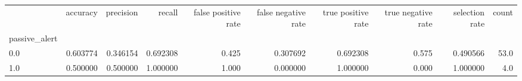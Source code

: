 \begin{tabular}{lrrrrrrrrr}
\toprule
{} &  accuracy &  precision &    recall &  false positive rate &  false negative rate &  true positive rate &  true negative rate &  selection rate &  count \\
passive\_alert &           &            &           &                      &                      &                     &                     &                 &        \\
\midrule
0.0           &  0.603774 &   0.346154 &  0.692308 &                0.425 &             0.307692 &            0.692308 &               0.575 &        0.490566 &   53.0 \\
1.0           &  0.500000 &   0.500000 &  1.000000 &                1.000 &             0.000000 &            1.000000 &               0.000 &        1.000000 &    4.0 \\
\bottomrule
\end{tabular}
